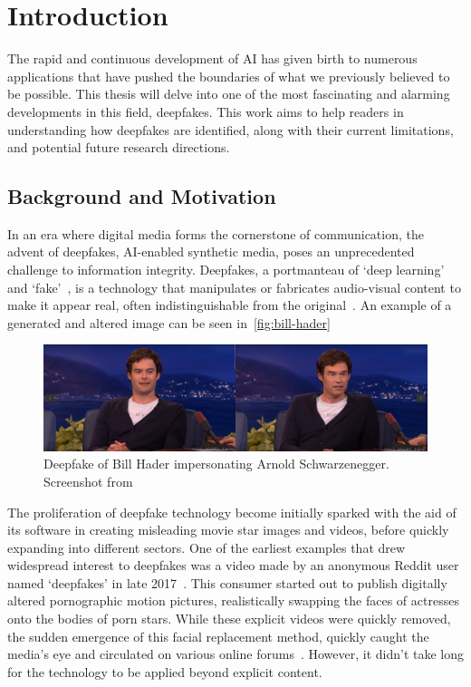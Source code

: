 
\chapter{Introduction}\label{chapter:introduction}
The rapid and continuous development of \ac{AI} has given birth to numerous
applications that have pushed the boundaries of what we previously believed to be possible.
This thesis will delve into one of the most fascinating and alarming developments in this
field, deepfakes. This work aims to help readers in understanding how deepfakes are
identified, along with their current limitations, and potential future research directions.



\section{Background and Motivation}\label{chapter:backgroundAndMotivation}
In an era where digital media forms the cornerstone of communication, the advent of deepfakes,
\ac{AI}-enabled synthetic media, poses an unprecedented challenge to information integrity.
Deepfakes, a portmanteau of `deep learning' and `fake'~\cite{Gardiner2019FacialRS,10.1145/3425780,Nguyen_2022},
is a technology that manipulates or fabricates audio-visual content to make it appear
real, often indistinguishable from the original~\cite{10.1145/3543873.3587581}. An example of a generated and altered image can be seen in~\autoref{fig:bill-hader}
\begin{figure}[hb]
	\centering
	\includegraphics[scale=0.289]{figures/bill-arnold}
	\caption{Deepfake of Bill Hader impersonating Arnold Schwarzenegger. Screenshot from~\cite{bill-hader}}\label{fig:bill-hader}
\end{figure}

The proliferation of deepfake technology become initially sparked with the aid of
its software in creating misleading movie star images and videos, before quickly
expanding into different sectors. One of the earliest examples that drew widespread
interest to deepfakes was a video made by an anonymous Reddit user named `deepfakes'
in late 2017~\cite{10.1145/3491102.3517446, 10.1145/3425780}.
This consumer started out to publish digitally altered pornographic motion pictures,
realistically swapping the faces of actresses onto the bodies of porn stars.
While these explicit videos were quickly removed, the sudden emergence of this facial
replacement method, quickly caught the media's eye and circulated on various online forums~\cite{albahar2019deepfakes}.
However, it didn't take long for the technology to be applied beyond explicit content.


